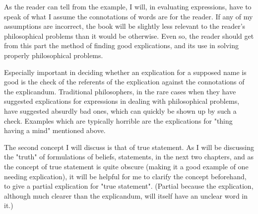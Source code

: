 \documentclass[10pt,twoside,draft]{memoir}
\begin{document}
As the reader can tell from the example, I will, in evaluating 
expressions, have to speak of what I assume the connotations of words are 
for the reader. If any of my assumptions are incorrect, the book will be 
slightly less relevant to the reader's philosophical problems than it would be 
otherwise. Even so, the reader should get from this part the method of 
finding good explications, and its use in solving properly philosophical 
problems. 

Especially important in deciding whether an explication for a supposed 
name is good is the check of the referents of the explication against the 
connotations of the explicandum. Traditional philosophers, in the rare cases 
when they have suggested explications for expressions in dealing with 
philosophical problems, have suggested absurdly bad ones, which can quickly 
be shown up by such a check. Examples which are typically horrible are the 
explications for "thing having a mind" mentioned above. 

The second concept I will discuss is that of true statement. As I will be 
discussing the "truth" of formulations of beliefs, statements, in the next two 
chapters, and as the concept of true statement is quite obscure (making it a 
good example of one needing explication), it will be helpful for me to clarify 
the concept beforehand, to give a partial explication for "true statement". 
(Partial because the explication, although much clearer than the 
explicandum, will itself have an unclear word in it.) 
\end{document}
